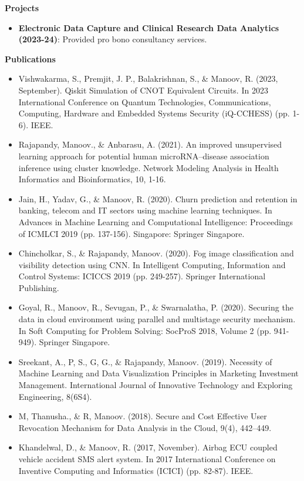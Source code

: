 \documentclass[a4paper,10pt]{article}
\newcommand{\cvsection}[1]{%
    \vspace{2mm}
    \begin{tcolorbox}
        \textbf{\large #1}
    \end{tcolorbox}
    \vspace{-4mm}
}
\begin{document}
\cvsection{Projects}
\begin{itemize}[leftmargin=*]
    \item \textbf{Electronic Data Capture and Clinical Research Data Analytics (2023-24)}: Provided pro bono consultancy services.
\end{itemize}
\cvsection{Publications}
\begin{itemize}[leftmargin=*]
    \item Vishwakarma, S., Premjit, J. P., Balakrishnan, S., \& Manoov, R. (2023, September). Qiskit Simulation of CNOT Equivalent Circuits. In 2023 International Conference on Quantum Technologies, Communications, Computing, Hardware and Embedded Systems Security (iQ-CCHESS) (pp. 1-6). IEEE.
    \item Rajapandy, Manoov., \& Anbarasu, A. (2021). An improved unsupervised learning approach for potential human microRNA–disease association inference using cluster knowledge. Network Modeling Analysis in Health Informatics and Bioinformatics, 10, 1-16.
    \item Jain, H., Yadav, G., \& Manoov, R. (2020). Churn prediction and retention in banking, telecom and IT sectors using machine learning techniques. In Advances in Machine Learning and Computational Intelligence: Proceedings of ICMLCI 2019 (pp. 137-156). Singapore: Springer Singapore.
    \item Chincholkar, S., \& Rajapandy, Manoov. (2020). Fog image classification and visibility detection using CNN. In Intelligent Computing, Information and Control Systems: ICICCS 2019 (pp. 249-257). Springer International Publishing.
    \item Goyal, R., Manoov, R., Sevugan, P., \& Swarnalatha, P. (2020). Securing the data in cloud environment using parallel and multistage security mechanism. In Soft Computing for Problem Solving: SocProS 2018, Volume 2 (pp. 941-949). Springer Singapore.
    \item Sreekant, A., P, S., G, G., \& Rajapandy, Manoov. (2019). Necessity of Machine Learning and Data Visualization Principles in Marketing Investment Management. International Journal of Innovative Technology and Exploring Engineering, 8(6S4).
    \item M, Thanusha., \& R, Manoov. (2018). Secure and Cost Effective User Revocation Mechanism for Data Analysis in the Cloud, 9(4), 442–449. 
    \item Khandelwal, D., \& Manoov, R. (2017, November). Airbag ECU coupled vehicle accident SMS alert system. In 2017 International Conference on Inventive Computing and Informatics (ICICI) (pp. 82-87). IEEE.
\end{itemize}
\end{document}
